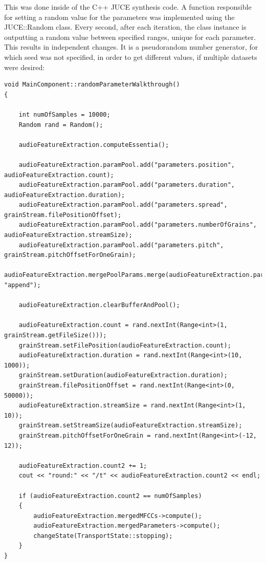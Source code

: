 This was done inside of the C++ JUCE synthesis code. A function
responsible for setting a random value for the parameters was
implemented using the JUCE::Random class. Every second, after each
iteration, the class instance is outputting a random value between
specified ranges, unique for each parameter. This results in
independent changes. It is a pseudorandom number generator, for which
seed was not specified, in order to get different values, if multiple
datasets were desired:

\begin{lstlisting}
void MainComponent::randomParameterWalkthrough()
{
    
    int numOfSamples = 10000;
    Random rand = Random();
  
    audioFeatureExtraction.computeEssentia();
  
    audioFeatureExtraction.paramPool.add("parameters.position", audioFeatureExtraction.count);
    audioFeatureExtraction.paramPool.add("parameters.duration", audioFeatureExtraction.duration);
    audioFeatureExtraction.paramPool.add("parameters.spread", grainStream.filePositionOffset);
    audioFeatureExtraction.paramPool.add("parameters.numberOfGrains", audioFeatureExtraction.streamSize);
    audioFeatureExtraction.paramPool.add("parameters.pitch", grainStream.pitchOffsetForOneGrain);
    audioFeatureExtraction.mergePoolParams.merge(audioFeatureExtraction.paramPool, "append");
  
    audioFeatureExtraction.clearBufferAndPool();
    
    audioFeatureExtraction.count = rand.nextInt(Range<int>(1, grainStream.getFileSize()));
    grainStream.setFilePosition(audioFeatureExtraction.count);
    audioFeatureExtraction.duration = rand.nextInt(Range<int>(10, 1000));
    grainStream.setDuration(audioFeatureExtraction.duration);
    grainStream.filePositionOffset = rand.nextInt(Range<int>(0, 50000));
    audioFeatureExtraction.streamSize = rand.nextInt(Range<int>(1, 10));
    grainStream.setStreamSize(audioFeatureExtraction.streamSize);
    grainStream.pitchOffsetForOneGrain = rand.nextInt(Range<int>(-12, 12));
    
    audioFeatureExtraction.count2 += 1;
    cout << "round:" << "/t" << audioFeatureExtraction.count2 << endl;
  
    if (audioFeatureExtraction.count2 == numOfSamples)
    {
        audioFeatureExtraction.mergedMFCCs->compute();
        audioFeatureExtraction.mergedParameters->compute();
        changeState(TransportState::stopping);
    }
}
\end{lstlisting}

